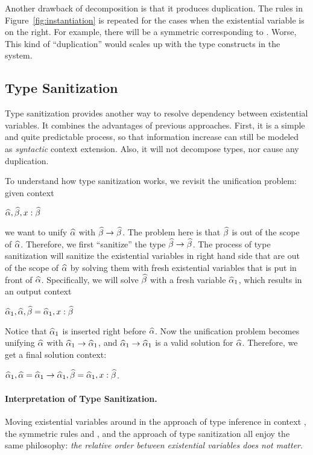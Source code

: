 Another drawback of decomposition is that it produces duplication. The rules in
Figure~\ref{fig:instantiation} is repeated for the cases when the existential
variable is on the right. For example, there will be a symmetric 
corresponding to . Worse, This kind of ``duplication'' would
scales up with the type constructs in the system.

\subsection{Type Sanitization}
\label{subsec:sanitization}

Type sanitization provides another way to resolve dependency between existential
variables. It combines the advantages of previous approaches. First, it is a
simple and quite predictable process, so that information increase can still be
modeled as \textit{syntactic} context extension. Also, it will not decompose
types, nor cause any duplication.

To understand how type sanitization works, we revisit the unification
problem: given context

$\widehat{\alpha}, \widehat{\beta}, x: \widehat{\beta}$

\noindent we want to unify $\widehat{\alpha}$ with $\widehat{\beta} \to \widehat{\beta}$. The problem here is
that $\widehat{\beta}$ is out of the scope of $\widehat{\alpha}$. Therefore, we first ``sanitize''
the type $\widehat{\beta} \to \widehat{\beta}$. The process of type sanitization will sanitize the
existential variables in right hand side that are out of the scope of $\widehat{\alpha}$ by
solving them with fresh existential variables that is put in front of $\widehat{\alpha}$.
Specifically, we will solve
$\widehat{\beta}$ with a fresh variable $\widehat{\alpha}_1$, which results in an output context

$\widehat{\alpha}_1, \widehat{\alpha}, \widehat{\beta} = \widehat{\alpha}_1, x: \widehat{\beta}$

Notice that $\widehat{\alpha}_1$ is inserted right before $\widehat{\alpha}$. Now the unification
problem becomes unifying $\widehat{\alpha}$ with $\widehat{\alpha}_1 \to \widehat{\alpha}_1$, and $\widehat{\alpha}_1 \to
\widehat{\alpha}_1$ is a valid solution for $\widehat{\alpha}$. Therefore, we get a final solution
context:

$\widehat{\alpha}_1, \widehat{\alpha} = \widehat{\alpha}_1 \to \widehat{\alpha}_1, \widehat{\beta} = \widehat{\alpha}_1, x : \widehat{\beta}$.


\paragraph{Interpretation of Type Sanitization.}
Moving existential variables around in the approach of type inference in context
\citep{gundry2010type}, the symmetric rules  and
 \citep{dunfield2013complete}, and the approach of type
sanitization all enjoy the same philosophy: \textit{the relative order between
  existential variables does not matter}.

